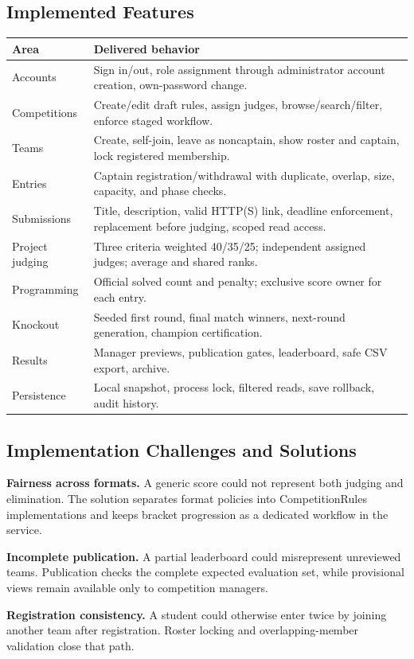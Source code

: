 \subsection{Implemented Features}
\begin{tabularx}{\linewidth}{lY}\toprule Area & Delivered behavior\\\midrule
Accounts & Sign in/out, role assignment through administrator account creation, own-password change.\\
Competitions & Create/edit draft rules, assign judges, browse/search/filter, enforce staged workflow.\\
Teams & Create, self-join, leave as noncaptain, show roster and captain, lock registered membership.\\
Entries & Captain registration/withdrawal with duplicate, overlap, size, capacity, and phase checks.\\
Submissions & Title, description, valid HTTP(S) link, deadline enforcement, replacement before judging, scoped read access.\\
Project judging & Three criteria weighted 40/35/25; independent assigned judges; average and shared ranks.\\
Programming & Official solved count and penalty; exclusive score owner for each entry.\\
Knockout & Seeded first round, final match winners, next-round generation, champion certification.\\
Results & Manager previews, publication gates, leaderboard, safe CSV export, archive.\\
Persistence & Local snapshot, process lock, filtered reads, save rollback, audit history.\\\bottomrule\end{tabularx}
\subsection{Implementation Challenges and Solutions}
\textbf{Fairness across formats.} A generic score could not represent both judging and elimination. The solution separates format policies into CompetitionRules implementations and keeps bracket progression as a dedicated workflow in the service.

\textbf{Incomplete publication.} A partial leaderboard could misrepresent unreviewed teams. Publication checks the complete expected evaluation set, while provisional views remain available only to competition managers.

\textbf{Registration consistency.} A student could otherwise enter twice by joining another team after registration. Roster locking and overlapping-member validation close that path.

